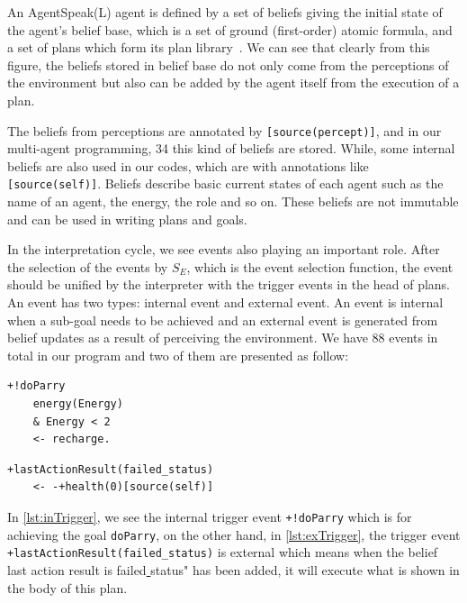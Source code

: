An AgentSpeak(L) agent is defined by a set of beliefs giving the initial state of the agent's belief base, which is a set of ground (first-order) atomic formula, and a set of plans which form its plan library~\cite{rafael_BDIAgent_2005}.
We can see that clearly from this figure, the beliefs stored in belief base do not only come from the perceptions of the environment but also can be added by the agent itself from the execution of a plan.

The beliefs from perceptions are annotated by \texttt{[source(percept)]}, and in our multi-agent programming, 34 this kind of beliefs are stored.
While, some internal beliefs are also used in our codes, which are with annotations like \texttt{[source(self)]}.
Beliefs describe basic current states of each agent such as the name of an agent, the energy, the role and so on.
These beliefs are not immutable and can be used in writing plans and goals.

In the interpretation cycle, we see events also playing an important role.
After the selection of the events by $S_E$, which is the event selection function, the event should be unified by the interpreter with the trigger events in the head of plans.
An event has two types: internal event and external event.
An event is internal when a sub-goal needs to be achieved and an external event is generated from belief updates as a result of perceiving the environment.
We have 88 events in total in our program and two of them are presented as follow:

\begin{lstlisting}[caption={Internal Trigger Event.},label={lst:inTrigger}]
  +!doParry
    energy(Energy)
    & Energy < 2
    <- recharge.
\end{lstlisting}

\begin{lstlisting}[caption={External Trigger Event.},label={lst:exTrigger}]
  +lastActionResult(failed_status)
    <- -+health(0)[source(self)]
\end{lstlisting}

In \autoref{lst:inTrigger}, we see the internal trigger event \texttt{+!doParry} which is for achieving the goal \texttt{doParry}, on the other hand, in \autoref{lst:exTrigger}, the trigger event \texttt{+lastActionResult(failed\_status)} is external which means when the belief last action result is failed\underline{ }status" has been added, it will execute what is shown in the body of this plan.

